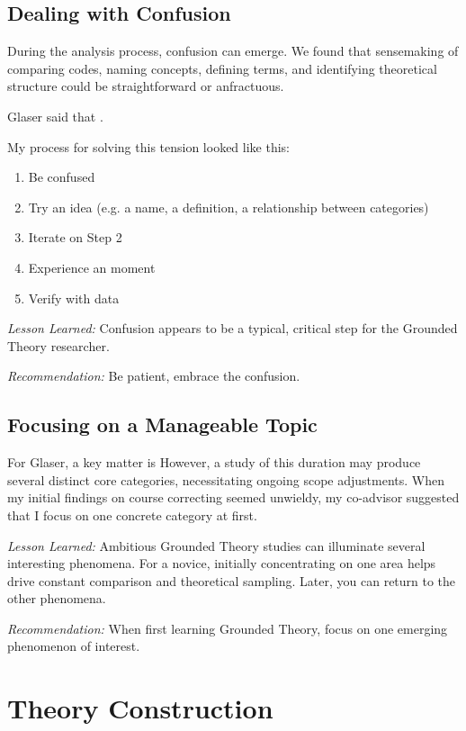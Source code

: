 \subsection{Dealing with Confusion}
During the analysis process, confusion can emerge. We found that sensemaking of comparing codes, naming concepts, defining terms, and identifying theoretical structure could be straightforward or anfractuous.

Glaser said that  \cite{GlaserMillValleyWorkshop}. 

My process for solving this tension looked like this:

\begin{enumerate}
  \item Be confused
  \item Try an idea (e.g. a name, a definition, a relationship between categories)
  \item Iterate on Step 2
  \item Experience an  moment
  \item Verify with data
\end{enumerate}

\textit{Lesson Learned:} Confusion appears to be a typical, critical step for the Grounded Theory researcher.

\textit{Recommendation:} Be patient, embrace the confusion.
\subsection{Focusing on a Manageable Topic}
For Glaser, a key matter is  However, a study of this duration may produce several distinct core categories, necessitating ongoing scope adjustments. When my initial findings on course correcting seemed unwieldy, my co-advisor suggested that I focus on one concrete category at first. 

\textit{Lesson Learned:} Ambitious Grounded Theory studies can illuminate several interesting phenomena. For a novice, initially concentrating on one area helps drive constant comparison and theoretical sampling. Later, you can return to the other phenomena.

\textit{Recommendation:} When first learning Grounded Theory, focus on one emerging phenomenon of interest. 
\section{Theory Construction}
\label{TheoryConstruction}

